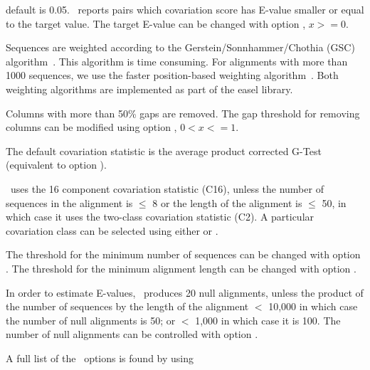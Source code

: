 \begin{sreitems}{}
\item[\emprog{Target E-value:}]default is 0.05. \rscape\, reports
  pairs which covariation score has E-value smaller or equal to the
  target value.  The target E-value can be changed with option
  , $x >= 0$.

\item[\emprog{Sequence weighting:}]Sequences are weighted according to
  the Gerstein/Sonnhammer/Chothia (GSC)
  algorithm~\citep{Gerstein94}. This algorithm is time consuming. For
  alignments with more than 1000 sequences, we use the faster
  position-based weighting algorithm~\citep{Henikoff94b}. Both
  weighting algorithms are implemented as part of the easel library.

\item[\emprog{Gaps in columns:}]Columns with more than 50\% gaps are
  removed. The gap threshold for removing columns can be modified
   using option  , $0<x<=1$.

 \item[\emprog{Covariation statistic:}]The default covariation statistic
   is the average product corrected G-Test (equivalent to option
   ).

 \item[\emprog{Covariation Class:}]\rscape\ uses the 16 component
   covariation statistic (C16), unless the number of sequences in the
   alignment is $\leq$ 8 or the length of the alignment is $\leq$ 50,
   in which case it uses the two-class covariation statistic (C2). A
   particular covariation class can be selected using either
    or .

   The threshold for the minimum number of sequences can be changed
   with option .  The threshold for the minimum
   alignment length can be changed with option .

 \item[\emprog{Null alignments:}]In order to estimate E-values,
   \rscape\ produces 20 null alignments, unless the product of the
   number of sequences by the length of the alignment $<$ 10,000 in
   which case the number of null alignments is 50; or $<$ 1,000 in
   which case it is 100. The number of null alignments can be
   controlled with option .
 \end{sreitems}

 A full list of the \rscape\ options is found by using


 
 
